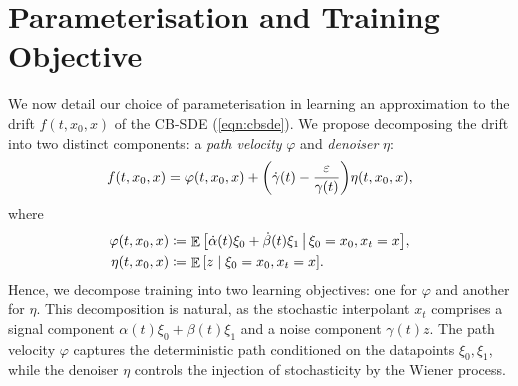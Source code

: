 
\section{Parameterisation and Training Objective}
We now detail our choice of parameterisation in learning an approximation to the drift \(f(t,x_{0}, x)\)  of the CB-SDE (\ref{eqn:cbsde}). We propose decomposing the drift into two distinct components: a \textit{path velocity} \(\varphi\) and \textit{denoiser} \(\eta\):
\begin{equation}
  f(t, x_{0}, x) = \varphi(t, x_{0}, x) + \qty(\dot{\gamma}(t) - \frac{\varepsilon}{\gamma(t)}) \eta(t,  x_{0}, x), \label{eqn:driftgoodparam}
\end{equation}
where
\begin{align*}
  \varphi(t, x_{0}, x) &\coloneqq \mathop{\mathbb{E}}\qty[\dot{\alpha}(t) \xi_{0} + \dot{\beta}(t)\xi_{1} \,\big|\, \xi_{0} = x_{0}, x_{t} = x], \\
  \eta(t, x_{0}, x) &\coloneqq \mathop{\mathbb{E}}\qty[z \mid \xi_{0} = x_{0}, x_{t} = x].
\end{align*}
Hence, we decompose training into two learning objectives: one for \(\varphi\) and another for \(\eta\). This decomposition is natural, as the stochastic interpolant \(x_{t}\) comprises a  signal component \(\alpha(t) \xi_{0} + \beta(t) \xi_{1}\) and a noise component \(\gamma(t) z\). The path velocity \(\varphi\) captures the deterministic path conditioned on the datapoints \(\xi_{0}, \xi_{1}\), while the denoiser \(\eta\) controls the injection of stochasticity by the Wiener process. %


